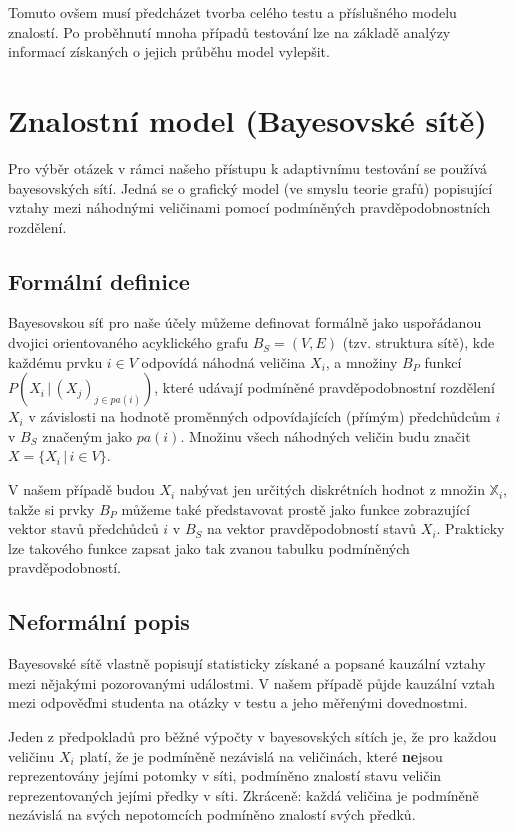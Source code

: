 \documentclass[a4paper,twoside,12pt]{book}
\begin{document}
Tomuto ovšem musí předcházet tvorba celého testu a příslušného modelu znalostí. Po proběhnutí mnoha případů testování lze na základě analýzy informací získaných o jejich průběhu model vylepšit.

\chapter{Znalostní model (Bayesovské sítě)}
Pro výběr otázek v rámci našeho přístupu k adaptivnímu testování se používá bayesovských sítí. Jedná se o grafický model (ve smyslu teorie grafů) popisující vztahy mezi náhodnými veličinami pomocí podmíněných pravděpodobnostních rozdělení.

\section{Formální definice}
Bayesovskou síť pro naše účely můžeme definovat formálně jako uspořádanou dvojici orientovaného acyklického grafu $B_S = (V,E)$ (tzv. struktura sítě), kde každému prvku $i \in V$ odpovídá náhodná veličina $X_i$, a množiny $B_P$  funkcí $P(X_i\,|\,(X_j)_{j\in pa(i)})$, které udávají podmíněné pravděpodobnostní rozdělení $X_i$ v závislosti na hodnotě proměnných odpovídajících (přímým) předchůdcům $i$ v $B_S$ značeným jako $pa(i)$. Množinu všech náhodných veličin budu značit $X=\{X_i\,|\,i \in V\}$.

V našem případě budou $X_i$ nabývat jen určitých diskrétních hodnot z množin $\mathbb{X}_i$, takže si prvky $B_P$ můžeme také představovat prostě jako funkce zobrazující vektor stavů předchůdců $i$ v $B_S$ na vektor pravděpodobností stavů $X_i$. Prakticky lze takového funkce zapsat jako tak zvanou tabulku podmíněných pravděpodobností.

\section{Neformální popis}
Bayesovské sítě vlastně popisují statisticky získané a popsané kauzální vztahy mezi nějakými pozorovanými událostmi. V našem případě půjde kauzální vztah mezi odpověďmi studenta na otázky v testu a jeho měřenými dovednostmi.

Jeden z předpokladů pro běžné výpočty v bayesovských sítích je, že pro každou veličinu $X_i$ platí, že je podmíněně nezávislá na veličinách, které  \textbf{ne}jsou reprezentovány jejími potomky v síti, podmíněno znalostí stavu veličin reprezentovaných jejími předky v síti. Zkráceně: každá veličina je podmíněně nezávislá na svých nepotomcích podmíněno znalostí svých předků.
\end{document}
